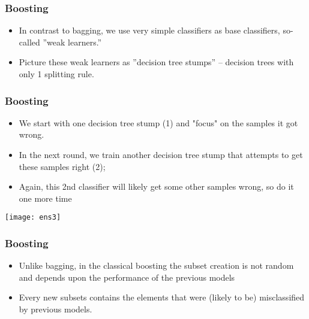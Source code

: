 \begin{frame}[fragile]\frametitle{Boosting}
\begin{itemize}
\item In contrast to bagging, we use very simple classifiers as base classifiers, so-called ''weak learners.'' 
\item Picture these weak learners as ''decision tree stumps'' -- decision trees with only 1 splitting rule. 
\end{itemize}
\end{frame}

\begin{frame}[fragile]\frametitle{Boosting}
\begin{itemize}
\item We start with one decision tree stump (1) and "focus" on the samples it got wrong. 
\item In the next round, we train another decision tree stump that attempts to get these samples right (2);
\item Again, this 2nd classifier will likely get some other samples wrong, so do it one more time
\end{itemize}
\begin{center}
\texttt{[image: ens3]}
\end{center}
\end{frame}





\begin{frame}[fragile]\frametitle{Boosting}
\begin{itemize}
\item Unlike bagging, in the classical boosting the subset creation is not random and depends upon the performance of the previous models
\item Every new subsets contains the elements that were (likely to be) misclassified by previous models.
\end{itemize}
\end{frame}


